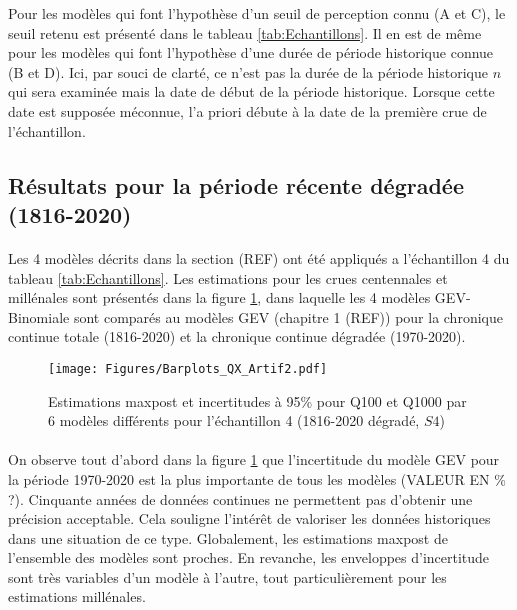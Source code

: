 \documentclass[11pt]{article}
\begin{document}
	Pour les modèles qui font l'hypothèse d'un seuil de perception connu (A et C), le seuil retenu est présenté dans le tableau \ref{tab:Echantillons}. Il en est de même pour les modèles qui font l'hypothèse d'une durée de période historique connue (B et D). Ici, par souci de clarté, ce n'est pas la durée de la période historique $n$ qui sera examinée mais la date de début de la période historique. Lorsque cette date est supposée méconnue, l'a priori débute à la date de la première crue de l'échantillon.
			
	\FloatBarrier	
	
	\subsection{Résultats pour la période récente dégradée (1816-2020)}
	
	\paragraph{} 
	Les 4 modèles décrits dans la section (REF) ont été appliqués a l'échantillon 4 du tableau \ref{tab:Echantillons}. Les estimations pour les crues centennales et millénales sont présentés dans la figure \ref{fig:Barplot_Artif2}, dans laquelle les 4 modèles GEV-Binomiale sont comparés au modèles GEV (chapitre 1 (REF)) pour la chronique continue totale (1816-2020) et la chronique continue dégradée (1970-2020). 
	
	\begin{figure}[h]
		\centering
		\texttt{[image: Figures/Barplots\_QX\_Artif2.pdf]}	
		\caption{Estimations maxpost et incertitudes à 95\% pour Q100 et Q1000 par 6 modèles différents pour l'échantillon 4 (1816-2020 dégradé, $S4$)}
		\label{fig:Barplot_Artif2}
	\end{figure}
	
	\paragraph{} On observe tout d'abord dans la figure \ref{fig:Barplot_Artif2} que l'incertitude du modèle GEV pour la période 1970-2020 est la plus importante de tous les modèles (VALEUR EN \% ?). Cinquante années de données continues ne permettent pas d'obtenir une précision acceptable. Cela souligne l'intérêt de valoriser les données historiques dans une situation de ce type. Globalement, les estimations maxpost de l'ensemble des modèles sont proches. En revanche, les enveloppes d'incertitude sont très variables d'un modèle à l'autre, tout particulièrement pour les estimations millénales. 	
	
\end{document}
